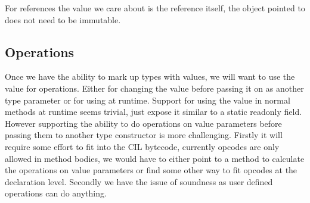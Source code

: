 For references the value we care about is the reference itself, the object pointed to does not need to be immutable.

\subsection{Operations}

Once we have the ability to mark up types with values, we will want
to use the value for operations. Either for changing the value before
passing it on as another type parameter or for using at runtime. Support
for using the value in normal methods at runtime seems trivial, just
expose it similar to a static readonly field. However supporting the
ability to do operations on value parameters before passing them to
another type constructor is more challenging. Firstly it will require
some effort to fit into the CIL bytecode, currently opcodes are only
allowed in method bodies, we would have to either point to a method
to calculate the operations on value parameters or find some other
way to fit opcodes at the declaration level. Secondly we have the
issue of soundness as user defined operations can do anything.